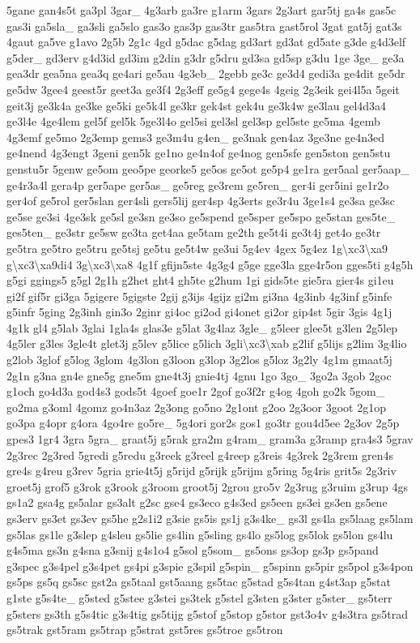 \begin{DoxyCompactItemize}
5gane gan4s5t ga3pl 3gar\-\_\- 4g3arb ga3re g1arm 3gars 2g3art gar5tj ga4s gas5c gas3i ga5sla\-\_\- ga3sli ga5slo gas3o gas3p gas3tr gas5tra gast5rol 3gat gat5j gat3s 4gaut ga5ve g1avo 2g5b 2g1c 4gd g5dac g5dag gd3art gd3at gd5ate g3de g4d3elf g5der\-\_\- gd3erv g4d3id gd3im g2din g3dr g5dru gd3sa gd5sp g3du 1ge 3ge\-\_\- ge3a gea3dr gea5na gea3q ge4ari ge5au 4g3eb\-\_\- 2gebb ge3c ge3d4 gedi3a ge4dit ge5dr ge5dw 3gee4 geest5r geet3a ge3f4 2g3eff ge5g4 gege4s 4geig 2g3eik gei4l5a 5geit geit3j ge3k4a ge3ke ge5ki ge5k4l ge3kr gek4st gek4u ge3k4w ge3lau gel4d3a4 ge3l4e 4ge4lem gel5f gel5k 5ge3l4o gel5si gel3sl gel3sp gel5ste ge5ma 4gemb 4g3emf ge5mo 2g3emp gems3 ge3m4u g4en\-\_\- ge3nak gen4az 3ge3ne ge4n3ed ge4nend 4g3engt 3geni gen5k ge1no ge4n4of ge4nog gen5sfe gen5ston gen5stu genstu5r 5genw ge5om geo5pe georke5 ge5os ge5ot ge5p4 ge1ra ger5aal ger5aap\-\_\- ge4r3a4l gera4p ger5ape ger5as\-\_\- ge5reg ge3rem ge5ren\-\_\- ger4i ger5ini ge1r2o ger4of ge5rol ger5slan ger4sli gers5lij ger4sp 4g3erts ge3r4u 3ge1s4 ge3sa ge3sc ge5se ge3si 4ge3sk ge5sl ge3sn ge3so ge5spend ge5sper ge5spo ge5stan ges5te\-\_\- ges5ten\-\_\- ge3str ge5sw ge3ta get4aa ge5tam ge2th ge5t4i ge3t4j get4o ge3tr ge5tra ge5tro ge5tru ge5tsj ge5tu ge5t4w ge3ui 5g4ev 4gex 5g4ez 1g\textbackslash{}xc3\textbackslash{}xa9 g\textbackslash{}xc3\textbackslash{}xa9di4 3g\textbackslash{}xc3\textbackslash{}xa8 4g1f gfijn5ste 4g3g4 g5ge gge3la gge4r5on gges5ti g4g5h g5gi ggings5 g5gl 2g1h g2het ght4 gh5te g2hum 1gi gids5te gie5ra gier4s gi1eu gi2f gif5r gi3ga 5gigere 5gigste 2gij g3ijs 4gijz gi2m gi3na 4g3inb 4g3inf g5infe g5infr 5ging 2g3inh gin3o 2ginr gi4oc gi2od gi4onet gi2or gip4st 5gir 3gis 4g1j 4g1k gl4 g5lab 3glai 1gla4s glas3e g5lat 3g4laz 3gle\-\_\- g5leer glee5t g3len 2g5lep 4g5ler g3les 3gle4t glet3j g5lev g5lice g5lich 3gli\textbackslash{}xc3\textbackslash{}xab g2lif g5lijs g2lim 3g4lio g2lob 3glof g5log 3glom 4g3lon g3loon g3lop 3g2los g5loz 3g2ly 4g1m gmaat5j 2g1n g3na gn4e gne5g gne5m gne4t3j gnie4tj 4gnu 1go 3go\-\_\- 3go2a 3gob 2goc g1och go4d3a god4s3 gods5t 4goef goe1r 2gof go3f2r g4og 4goh go2k 5gom\-\_\- go2ma g3oml 4gomz go4n3az 2g3ong go5no 2g1ont g2oo 2g3oor 3goot 2g1op go3pa g4opr g4ora 4go4re go5re\-\_\- 5g4ori gor2s gos1 go3tr gou4d5ee 2g3ov 2g5p gpes3 1gr4 3gra 5gra\-\_\- graat5j g5rak gra2m g4ram\-\_\- gram3a g3ramp gra4s3 5grav 2g3rec 2g3red 5gredi g5redu g3reek g3reel g4reep g3reis 4g3rek 2g3rem gren4s gre4s g4reu g3rev 5gria grie4t5j g5rijd g5rijk g5rijm g5ring 5g4ris grit5s 2g3riv groet5j grof5 g3rok g3rook g3room groot5j 2grou gro5v 2g3rug g3ruim g3rup 4gs gs1a2 gsa4g gs5alar gs3alt g2sc gse4 gs3eco g4s3ed gs5een gs3ei gs3en gs5ene gs3erv gs3et gs3ev gs5he g2s1i2 g3sie gs5is gs1j g3s4ke\-\_\- gs3l gs4la gs5laag gs5lam gs5las gs1le g3slep g4sleu gs5lie gs4lin g5sling gs4lo gs5log gs5lok gs5lon gs4lu g4s5ma gs3n g4sna g3snij g4s1o4 g5sol g5som\-\_\- gs5ons gs3op gs3p gs5pand g3spec g3s4pel g3s4pet gs4pi g3spie g3spil g5spin\-\_\- g5spinn gs5pir gs5pol g3s4pon gs5ps gs5q gs5sc gst2a gs5taal gst5aang gs5tac g5stad g5s4tan g4st3ap g5stat g1ste g5s4te\-\_\- g5sted g5stee g3stei gs3tek g5stel g3sten g3ster g5ster\-\_\- gs5terr g5sters gs3th g5s4tic g3s4tig gs5tijg g5stof g5stop g5stor gst3o4v g4s3tra gs5trad gs5trak gst5ram gs5trap g5strat gst5res gs5troe gs5tron 
\end{DoxyCompactItemize}
